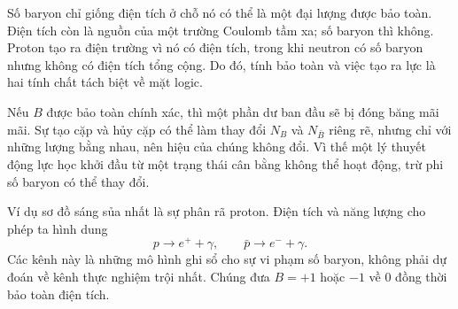 \begin{classroomqa}
\end{classroomqa}

Số baryon chỉ giống điện tích ở chỗ nó có thể là một đại lượng được bảo toàn. Điện tích còn là nguồn của một trường Coulomb tầm xa; số baryon thì không. Proton tạo ra điện trường vì nó có điện tích, trong khi neutron có số baryon nhưng không có điện tích tổng cộng. Do đó, tính bảo toàn và việc tạo ra lực là hai tính chất tách biệt về mặt logic.

\begin{classroomqa}
\end{classroomqa}

Nếu \(B\) được bảo toàn chính xác, thì một phần dư ban đầu sẽ bị đóng băng mãi mãi. Sự tạo cặp và hủy cặp có thể làm thay đổi \(N_B\) và \(N_{\bar B}\) riêng rẽ, nhưng chỉ với những lượng bằng nhau, nên hiệu của chúng không đổi. Vì thế một lý thuyết động lực học khởi đầu từ một trạng thái cân bằng không thể hoạt động, trừ phi số baryon có thể thay đổi.

Ví dụ sơ đồ sáng sủa nhất là sự phân rã proton. Điện tích và năng lượng cho phép ta hình dung
\begin{equation}
p\longrightarrow e^+ +\gamma,
\qquad
\bar p\longrightarrow e^-+\gamma.
\label{eq:c08-decay-pair}
\end{equation}
Các kênh này là những mô hình ghi sổ cho sự vi phạm số baryon, không phải dự đoán về kênh thực nghiệm trội nhất. Chúng đưa \(B=+1\) hoặc \(-1\) về 0 đồng thời bảo toàn điện tích.

